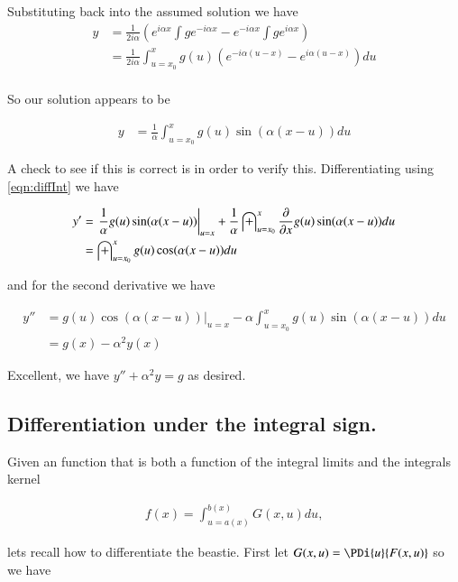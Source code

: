 \documentclass{article}
\begin{document}
Substituting back into the assumed solution we have
\begin{align*}
y
&= \frac{1}{2 i \alpha} \left(
  e^{ i \alpha x } \int g e^{ -i \alpha x }
- e^{ -i \alpha x } \int g e^{ i \alpha x }
\right) \\
&= \frac{1}{2 i \alpha} \int_{u=x_0}^x g(u) \left( e^{ -i \alpha (u-x) } -e^{ i \alpha (u-x) } \right) du \\
\end{align*}

So our solution appears to be

\begin{align}\label{eqn:solutionToWaveNumberDomainEquation}
y &= \frac{1}{\alpha} \int_{u=x_0}^x g(u) \sin( \alpha(x-u) ) du
\end{align}

A check to see if this is correct is in order to verify this.  Differentiating using \ref{eqn:diffInt} we have

\begin{align*}
y'
&=
{\left.
\frac{1}{\alpha}
g(u) \sin( \alpha(x-u) ) \right\vert}_{u=x}
+\frac{1}{\alpha} \int_{u=x_0}^x \frac{\partial {}}{\partial {x}} g(u) \sin( \alpha(x-u) ) du \\
&= \int_{u=x_0}^x g(u) \cos( \alpha(x-u) ) du \\
\end{align*}

and for the second derivative we have

\begin{align*}
y''
&=
{\left. g(u) \cos( \alpha(x-u) ) \right\vert}_{u=x}
- \alpha \int_{u=x_0}^x g(u) \sin( \alpha(x-u) ) du \\
&= g(x) - \alpha^2 y(x)
\end{align*}

Excellent, we have $y'' + \alpha^2 y = g$ as desired.

\subsection{ Differentiation under the integral sign. }

Given an function that is both a function of the integral limits and the integrals kernel

\begin{align*}
f(x) = \int_{u = a(x)}^{b(x)} G(x,u) du,
\end{align*}

lets recall how to differentiate the beastie.  First let $G(x,u) = \PDi{u}{F(x,u)}$ so we have
\end{document}
